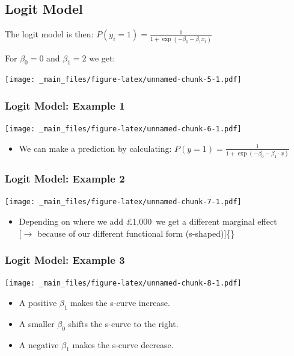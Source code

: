 \documentclass[]{article}
\providecommand{\tightlist}{%
  \setlength{\itemsep}{0pt}\setlength{\parskip}{0pt}}
\theoremstyle{definition}
\theoremstyle{definition}
\theoremstyle{remark}
\begin{document}
\subsection{Logit Model}\label{logit-model}

The logit model is then:
\(P(y_i=1)=\frac{1}{1 + \exp(-\beta_0 - \beta_1 x_i)}\)

For \(\beta_0 = 0\) and \(\beta_1=2\) we get:

\texttt{[image: \_main\_files/figure-latex/unnamed-chunk-5-1.pdf]}

\subsubsection{Logit Model: Example 1}\label{logit-model-example-1}

\texttt{[image: \_main\_files/figure-latex/unnamed-chunk-6-1.pdf]}

\begin{itemize}
\tightlist
\item
  We can make a prediction by calculating:
  \(P(y=1) = \frac{1}{1+\exp(-\beta_0 - \beta_1\cdot x)}\)
\end{itemize}

\subsubsection{Logit Model: Example 2}\label{logit-model-example-2}

\texttt{[image: \_main\_files/figure-latex/unnamed-chunk-7-1.pdf]}

\begin{itemize}
\tightlist
\item
  Depending on where we add £1,000~we get a different marginal effect\\
  {[}\(\rightarrow\) because of our different functional form
  (s-shaped){]}\{\}
\end{itemize}

\subsubsection{Logit Model: Example 3}\label{logit-model-example-3}

\texttt{[image: \_main\_files/figure-latex/unnamed-chunk-8-1.pdf]}

\begin{itemize}
\tightlist
\item
  A positive \(\beta_1\) makes the s-curve increase.
\item
  A smaller \(\beta_0\) shifts the s-curve to the right.
\item
  A negative \(\beta_1\) makes the s-curve decrease.
\end{itemize}
\end{document}
